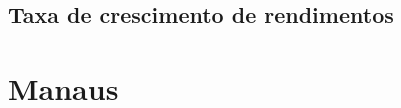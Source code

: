 \documentclass[10pt]{beamer}
\begin{document}
\begin{frame}
\textit{\hyperlink{indice_principal_amz_pa}{}}

\end{frame}

\begin{frame}
\textit{\hyperlink{indice_principal_amz_pa}{}}

\end{frame}

\begin{frame}
\textit{\hyperlink{indice_principal_amz_pa}{}}

\end{frame}

\subsection{Taxa de crescimento de rendimentos}

\begin{frame}
\textit{\hyperlink{indice_principal_amz_pa}{}}

\end{frame}

\begin{frame}
\textit{\hyperlink{indice_principal_amz_pa}{}}

\end{frame}

\begin{frame}
\textit{\hyperlink{indice_principal_amz_pa}{}}

\end{frame}

\section{Manaus}
\end{document}
